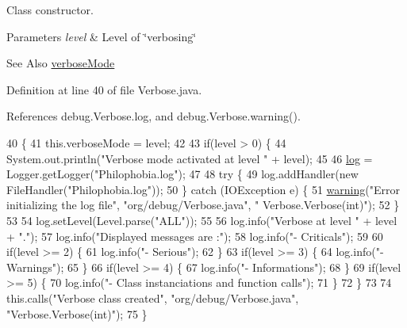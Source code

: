 Class constructor. 


\begin{DoxyParams}{Parameters}
{\em level} & Level of \char`\"{}verbosing\char`\"{} \\
\hline
\end{DoxyParams}
\begin{DoxySeeAlso}{See Also}
\hyperlink{a00035_a2269eebcfd65682c66c8401d59bb0d70}{verbose\-Mode} 
\end{DoxySeeAlso}


Definition at line 40 of file Verbose.\-java.



References debug.\-Verbose.\-log, and debug.\-Verbose.\-warning().


\begin{DoxyCode}
40                               \{
41         this.verboseMode = level;
42 
43         \textcolor{keywordflow}{if}(level > 0) \{
44             System.out.println(\textcolor{stringliteral}{"Verbose mode activated at level "} + level);
45             
46                 \hyperlink{a00035_a1642fc3a3308caeb65e4d837675591e5}{log} = Logger.getLogger(\textcolor{stringliteral}{"Philophobia.log"});
47                 
48                 \textcolor{keywordflow}{try} \{
49                     log.addHandler(\textcolor{keyword}{new} FileHandler(\textcolor{stringliteral}{"Philophobia.log"}));
50                 \} \textcolor{keywordflow}{catch} (IOException e) \{
51                     \hyperlink{a00035_a178f9afaeb03db850592a967ab911dee}{warning}(\textcolor{stringliteral}{"Error initializing the log file"}, \textcolor{stringliteral}{"org/debug/Verbose.java"}, \textcolor{stringliteral}{"
      Verbose.Verbose(int)"});
52                 \}
53 
54                 log.setLevel(Level.parse(\textcolor{stringliteral}{"ALL"}));
55 
56                 log.info(\textcolor{stringliteral}{"Verbose at level "} + level + \textcolor{stringliteral}{"."});
57                 log.info(\textcolor{stringliteral}{"Displayed messages are :"});
58                 log.info(\textcolor{stringliteral}{"- Criticals"});
59 
60                 \textcolor{keywordflow}{if}(level >= 2) \{
61                     log.info(\textcolor{stringliteral}{"- Serious"});
62                 \}
63                 \textcolor{keywordflow}{if}(level >= 3) \{
64                     log.info(\textcolor{stringliteral}{"- Warnings"});
65                 \}
66                 \textcolor{keywordflow}{if}(level >= 4) \{
67                     log.info(\textcolor{stringliteral}{"- Informations"});
68                 \}
69                 \textcolor{keywordflow}{if}(level >= 5) \{
70                     log.info(\textcolor{stringliteral}{"- Class instanciations and function calls"});
71                 \}
72         \}
73 
74         this.calls(\textcolor{stringliteral}{"Verbose class created"}, \textcolor{stringliteral}{"org/debug/Verbose.java"}, \textcolor{stringliteral}{"Verbose.Verbose(int)"});
75     \}
\end{DoxyCode}


